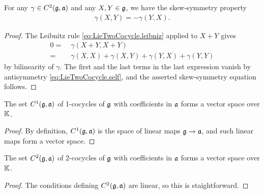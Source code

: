 \begin{lemma}
  \label{LieTwoCocycle_skew_symmetry}
  \leanok
  For any $\gamma \in C^2(\mathfrak{g},\mathfrak{a})$ and any $X,Y \in \mathfrak{g}$,
  we have the skew-symmetry property
  \begin{align*}
    \gamma(X,Y) = - \gamma(Y,X) .
  \end{align*}
\end{lemma}
\begin{proof}
  \leanok
  The Leibnitz rule \eqref{eq:LieTwoCocycle.leibniz}
  applied to $X+Y$ gives
  \begin{align*}
    0 = \; & \gamma(X+Y,X+Y) \\
      = \; & \gamma(X,X) + \gamma(X,Y) + \gamma(Y,X) + \gamma(Y,Y)
  \end{align*}
  by bilinearity of $\gamma$. The first and the last terms
  in the last expression vanish by antisymmetry \eqref{eq:LieTwoCocycle.self},
  and the asserted skew-symmetry equation follows.
\end{proof}

\begin{lemma}
  \label{lem:LieOneCocycle_vectorSpace}
  \leanok
  The set $C^1(\mathfrak{g}, \mathfrak{a})$ of 1-cocycles of $\mathfrak{g}$ with
  coefficients in $\mathfrak{a}$ forms a vector space over $\mathbb{K}$.
\end{lemma}
\begin{proof}
  \leanok
  By definition, $C^1(\mathfrak{g}, \mathfrak{a})$ is the space of
  linear maps $\mathfrak{g} \to \mathfrak{a}$, and such linear maps form
  a vector space.
\end{proof}

\begin{lemma}
  \label{lem:LieTwoCocycle_vectorSpace}
  \leanok
  The set $C^2(\mathfrak{g}, \mathfrak{a})$ of 2-cocycles of $\mathfrak{g}$ with
  coefficients in $\mathfrak{a}$ forms a vector space over $\mathbb{K}$.
\end{lemma}
\begin{proof}
  \leanok
  The conditions defining $C^2(\mathfrak{g}, \mathfrak{a})$ are linear,
  so this is staightforward.
\end{proof}

